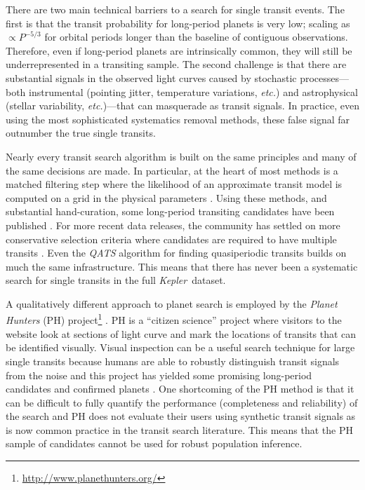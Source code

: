 \documentclass[12pt,preprint]{aastex}
\newcommand{\project}[1]{\textsl{#1}}
\newcommand{\kepler}{\project{Kepler}}
\newcommand{\foreign}[1]{\emph{#1}}
\newcommand{\etc}{\foreign{etc.}}
\newcommand{\period}{{\ensuremath{P}}}
\begin{document}
There are two main technical barriers to a search for single transit events.
The first is that the transit probability for long-period planets is very low;
scaling as $\propto\period^{-5/3}$ for orbital periods longer than the
baseline of contiguous observations.
Therefore, even if long-period planets are intrinsically common, they will
still be underrepresented in a transiting sample.
The second challenge is that there are substantial signals in the observed
light curves caused by stochastic processes---both instrumental
(pointing jitter, temperature variations, \etc) and astrophysical (stellar
variability, \etc)---that can masquerade as transit signals.
In practice, even using the most sophisticated systematics removal methods,
these false signal far outnumber the true single transits.

Nearly every transit search algorithm is built on the same principles and many
of the same decisions are made.
In particular, at the heart of most methods is a matched filtering step where
the likelihood of an approximate transit model is computed on a grid in the
physical parameters \citep[\kepler\ Data Processing
Handbook\footnote{\url{https://archive.stsci.edu/kepler/manuals/KSCI-19081-001_Data_Processing_Handbook.pdf}};][]{%
Petigura:2013, Huang:2013, Dressing:2015, Foreman-Mackey:2015}.
Using these methods, and substantial hand-curation, some long-period
transiting candidates have been published \citep[for example][]{Batalha:2013,
Huang:2013, Kipping:2014a}.
For more recent data releases, the community has settled on more conservative
selection criteria where candidates are required to have multiple transits
\citep[for example][]{Petigura:2013, Burke:2014, Rowe:2015}.
Even the \project{QATS} algorithm \citep{Carter:2013} for finding
quasiperiodic transits builds on much the same infrastructure.
This means that there has never been a systematic search for single transits
in the full \kepler\ dataset.

A qualitatively different approach to planet search is employed by the
\project{Planet Hunters} (PH)
project\footnote{\url{http://www.planethunters.org/}} \citep{Fischer:2012}.
PH is a ``citizen science'' project where visitors to the website look at
sections of light curve and mark the locations of transits that can be
identified visually.
Visual inspection can be a useful search technique for large single transits
because humans are able to robustly distinguish transit signals from the noise
and this project has yielded some promising long-period candidates and
confirmed planets \citep[for example][]{Wang:2013}.
One shortcoming of the PH method is that it can be difficult to fully quantify
the performance (completeness and reliability) of the search and PH does not
evaluate their users using synthetic transit signals as is now common practice
in the transit search literature.
This means that the PH sample of candidates cannot be used for robust
population inference.
\end{document}
